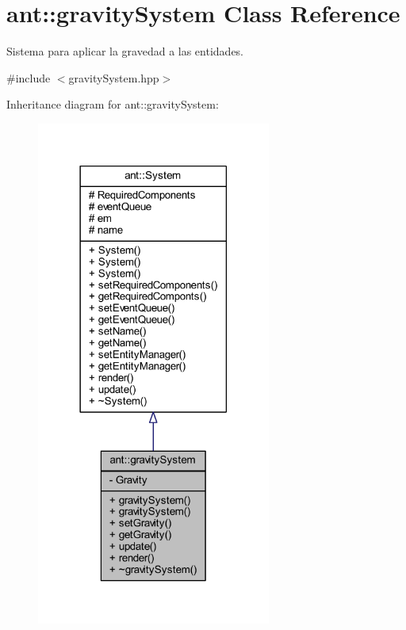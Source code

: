 \hypertarget{classant_1_1gravity_system}{\section{ant\+:\+:gravity\+System Class Reference}
\label{classant_1_1gravity_system}
}


Sistema para aplicar la gravedad a las entidades.  




{\ttfamily \#include $<$gravity\+System.\+hpp$>$}



Inheritance diagram for ant\+:\+:gravity\+System\+:
\nopagebreak
\begin{figure}[H]
\begin{center}
\leavevmode
\includegraphics[width=218pt]{d4/d1a/classant_1_1gravity_system__inherit__graph}
\end{center}
\end{figure}


